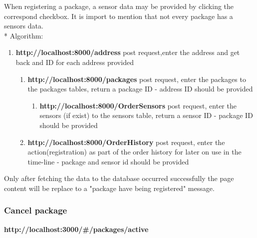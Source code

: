 When registering a package, a sensor data may be provided by clicking the correspond checkbox. It is import to mention that not every package has a sensors data.\\*
Algorithm:
\begin{enumerate}
  \item \textbf{http://localhost:8000/address} post request,enter the address and get back and ID for each address provided
    \begin{enumerate}
        \item \textbf {http://localhost:8000/packages}  post request, enter the packages to the packages tables, return a package ID - address ID should be provided
        \begin{enumerate}
        \item \textbf {http://localhost:8000/OrderSensors}  post request, enter the sensors (if exist)  to the sensors table, return a sensor ID - package ID should be provided
        \end{enumerate}
    \item \textbf {http://localhost:8000/OrderHistory}  post request, enter the action(registration) as part of the order history for later on use in the time-line -  package and sensor id should be provided\\
    \end{enumerate}
\end{enumerate}

Only after fetching the data to the database occurred successfully the page content will be replace to a "package have being registered" message.


\subsubsection{Cancel package}
\textbf{http://localhost:3000/\#/packages/active}\\

